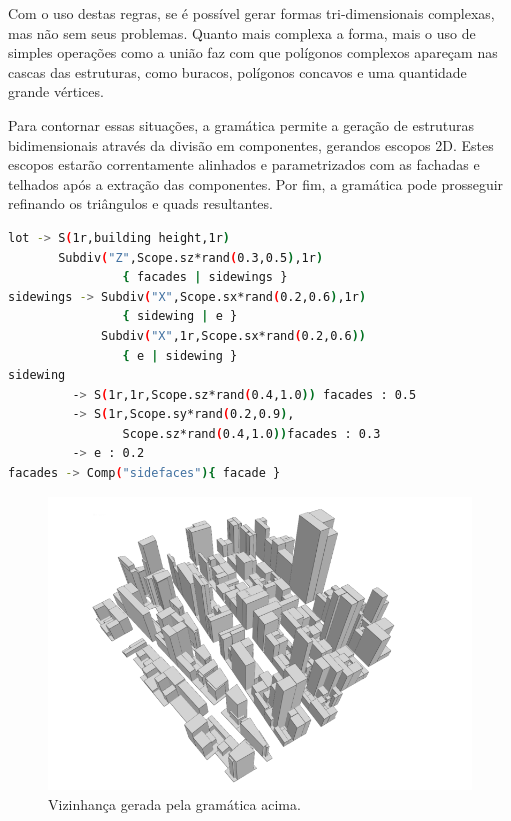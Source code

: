 \documentclass[a4paper, 11pt]{article}
\begin{document}
    Com o uso destas regras, se é possível gerar formas tri-dimensionais complexas, mas não sem seus problemas. Quanto mais complexa a forma, mais o uso de simples operações como a união faz com que polígonos complexos apareçam nas cascas das estruturas, como buracos, polígonos concavos e uma quantidade grande vértices. 

    Para contornar essas situações, a gramática permite a geração de estruturas bidimensionais através da divisão em componentes, gerandos escopos 2D. Estes escopos estarão correntamente alinhados e parametrizados com as fachadas e telhados após a extração das componentes. Por fim, a gramática pode prosseguir refinando os triângulos e quads resultantes. 

    \begin{center}
        \begin{lstlisting}[language=sh,caption=Exemplo de \textit{Shape Grammar}, frame=single, basicstyle=\ttfamily\small, captionpos=b]
lot -> S(1r,building height,1r)
       Subdiv("Z",Scope.sz*rand(0.3,0.5),1r)
                { facades | sidewings }
sidewings -> Subdiv("X",Scope.sx*rand(0.2,0.6),1r)
                { sidewing | e }
             Subdiv("X",1r,Scope.sx*rand(0.2,0.6))
                { e | sidewing }
sidewing
         -> S(1r,1r,Scope.sz*rand(0.4,1.0)) facades : 0.5
         -> S(1r,Scope.sy*rand(0.2,0.9),
                Scope.sz*rand(0.4,1.0))facades : 0.3
         -> e : 0.2
facades -> Comp("sidefaces"){ facade }
        \end{lstlisting}
        \label{lst:shapegrammar}
    \end{center}

    \begin{figure}[h]
        \centering
        \includegraphics[width=\textwidth]{imgs/grammarcity.png}
        \caption{Vizinhança gerada pela gramática acima.}
        \label{fig:skyscrapper}
    \end{figure}  
\end{document}
